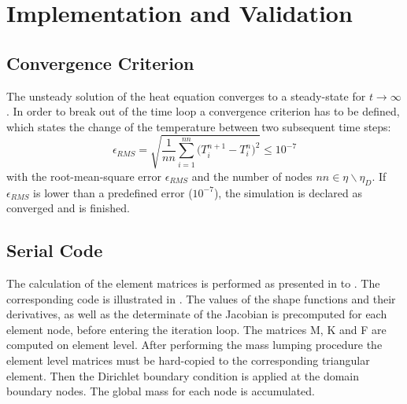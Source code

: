 \section{Implementation and Validation}

\subsection{Convergence Criterion}
The unsteady solution of the heat equation converges to a steady-state for $t\rightarrow \infty$. In order to break out of the time loop a convergence criterion has to be defined, which states the change of the temperature between two subsequent time steps:
\begin{equation}
	\label{eq:convergence}
	\epsilon_{RMS} = \sqrt{\frac{1}{nn} \sum_{i=1}^{nn} \Big( T_i^{n+1} - T_i^n \Big)^2} \leq 10^{-7}
\end{equation}
with the root-mean-square error $\epsilon_{RMS}$ and the number of nodes $nn \in \eta \backslash \eta_D$. If $\epsilon_{RMS}$ is lower than a predefined error ($10^{-7}$), the simulation is declared as converged and is finished.

\subsection{Serial Code}

The calculation of the element matrices is performed as presented in  to . The corresponding code is illustrated in . The values of the shape functions and their derivatives, as well as the determinate of the Jacobian is precomputed for each element node, before entering the iteration loop. The matrices M, K and F are computed on element level. After performing the mass lumping procedure the element level matrices must be hard-copied to the corresponding triangular element.
Then the Dirichlet boundary condition  is applied at the domain boundary nodes. The global mass for each node is accumulated. 

